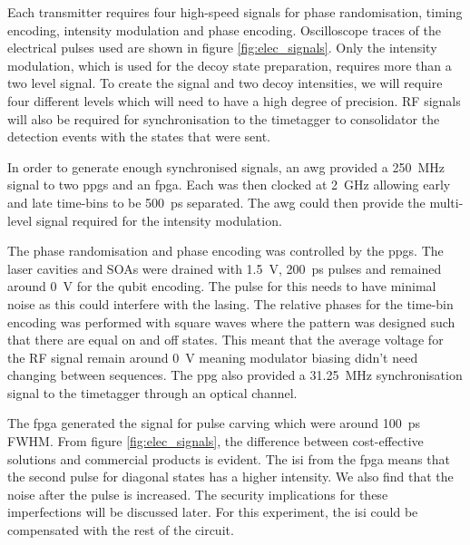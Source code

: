 
Each transmitter requires four high-speed signals for phase randomisation, timing encoding, intensity modulation and phase encoding. Oscilloscope traces of the electrical pulses used are shown in figure \ref{fig:elec_signals}. Only the intensity modulation, which is used for the decoy state preparation, requires more than a two level signal. To create the signal and two decoy intensities, we will require four different levels which will need to have a high degree of precision. RF signals will also be required for synchronisation to the timetagger to consolidator the detection events with the states that were sent. 


In order to generate enough synchronised signals, an \ac{awg} provided a \SI{250}{\MHz} signal to two \acp{ppg} and an \ac{fpga}. Each was then clocked at \SI{2}{GHz} allowing early and late time-bins to be \SI{500}{ps} separated. The \ac{awg} could then provide the multi-level signal required for the intensity modulation.

The phase randomisation and phase encoding was controlled by the \acp{ppg}. The laser cavities and \acp{SOA} were drained with \SI{1.5}{\V}, \SI{200}{ps} pulses and remained around \SI{0}{\V} for the qubit encoding. The pulse for this needs to have minimal noise as this could interfere with the lasing. The relative phases for the time-bin encoding was performed with square waves where the pattern was designed such that there are equal on and off states. This meant that the average voltage for the RF signal remain around \SI{0}{\V} meaning modulator biasing didn't need changing between sequences. The \ac{ppg} also provided a \SI{31.25}{MHz} synchronisation signal to the timetagger through an optical channel. 

The \ac{fpga} generated the signal for pulse carving which were around \SI{100}{ps} \ac{FWHM}. From figure \ref{fig:elec_signals}, the difference between cost-effective solutions and commercial products is evident. The \ac{isi} from the \ac{fpga} means that the second pulse for diagonal states has a higher intensity. We also find that the noise after the pulse is increased. The security implications for these imperfections will be discussed later. For this experiment, the \ac{isi} could be compensated with the rest of the circuit.  

